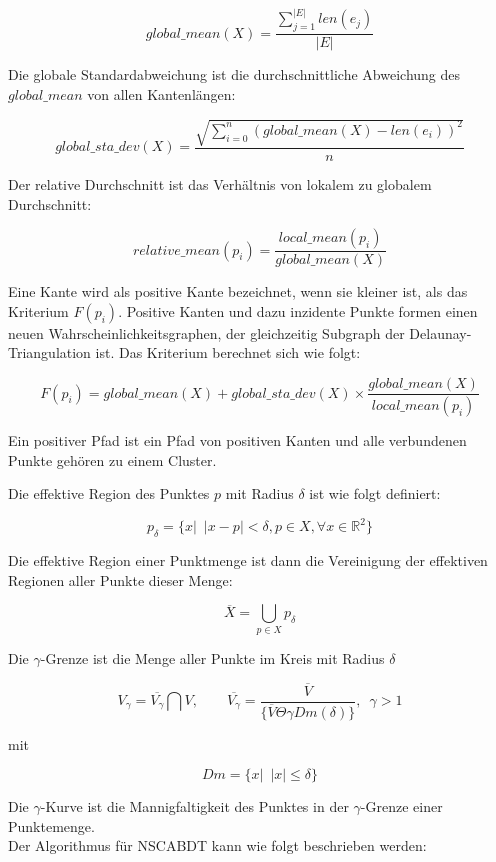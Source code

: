\documentclass[11pt,ceqn]{book}
\begin{document}
$$global\_mean(X) =\frac{\sum\limits_{j=1}^{|E|} len(e_j)}{|E|}$$

Die globale Standardabweichung ist die durchschnittliche Abweichung des $global\_mean$ von allen Kantenlängen:

$$global\_sta\_dev(X)= \frac{\sqrt{\sum\limits_{i=0}^n \left(global\_mean(X)-len(e_i)\right)^2}}{n}$$

Der relative Durchschnitt ist das Verhältnis von lokalem zu globalem Durchschnitt:

$$relative\_mean(p_i) = \frac{local\_mean(p_i)}{global\_mean(X)}$$

Eine Kante wird als positive Kante bezeichnet, wenn sie kleiner ist, als das Kriterium $F(p_i)$. Positive Kanten und dazu inzidente Punkte formen einen neuen Wahrscheinlichkeitsgraphen, der gleichzeitig Subgraph der Delaunay-Triangulation ist. Das Kriterium berechnet sich wie folgt:

$$F(p_i) = global\_mean(X) + global\_sta\_dev(X) \times \frac{global\_mean(X)}{local\_mean(p_i)}$$

Ein positiver Pfad ist ein Pfad von positiven Kanten und alle verbundenen Punkte gehören zu einem Cluster.

Die effektive Region des Punktes $p$ mit Radius $\delta$ ist wie folgt definiert:

$$p_{\delta} = \{x|\enspace|x-p|<\delta, p\in X,\forall x\in \mathbb{R}^2\}$$

Die effektive Region einer Punktmenge ist dann die Vereinigung der effektiven Regionen aller Punkte dieser Menge:

$$\overline{X} = \bigcup_{p\in X} p_{\delta}$$

Die $\gamma$-Grenze ist die Menge aller Punkte im Kreis mit Radius $\delta$

$$V_\gamma = \overline{V_{\gamma}} \bigcap V, \qquad \overline{V_{\gamma}} = 
\frac{\overline{V}}
{\{\overline{V} \Theta \gamma Dm(\delta)\}} 
, \enspace \gamma>1$$


mit 

$$Dm = \{x|\enspace |x|\leqslant \delta\}$$

Die $\gamma$-Kurve ist die Mannigfaltigkeit des Punktes in der $\gamma$-Grenze einer Punktemenge.\\

Der Algorithmus für NSCABDT kann wie folgt beschrieben werden:
\end{document}
